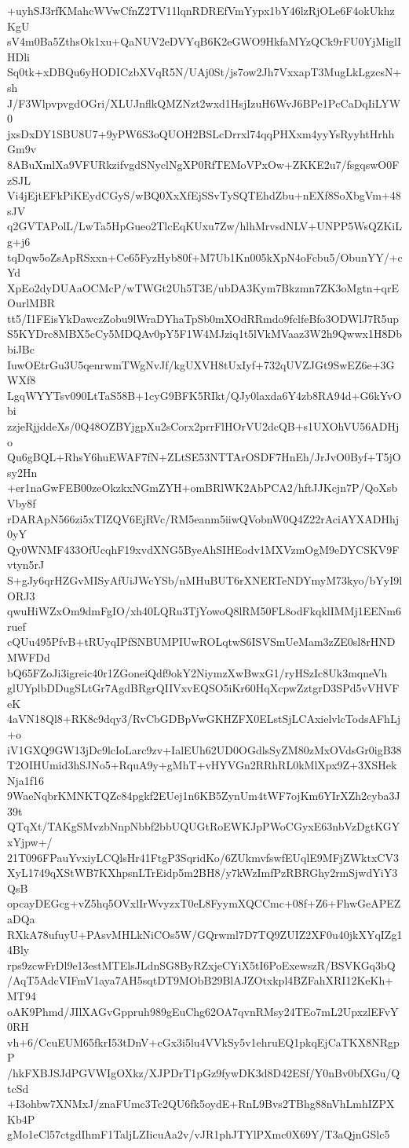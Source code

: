 +uyhSJ3rfKMahcWVwCfnZ2TV11lqnRDREfVmYypx1bY46lzRjOLe6F4okUkhzKgU
sV4m0Ba5ZthsOk1xu+QaNUV2eDVYqB6K2eGWO9HkfaMYzQCk9rFU0YjMiglIHDli
Sq0tk+xDBQu6yHODICzbXVqR5N/UAj0St/js7ow2Jh7VxxapT3MugLkLgzcsN+sh
J/F3WlpvpvgdOGri/XLUJnflkQMZNzt2wxd1HsjIzuH6WvJ6BPe1PcCaDqIiLYW0
jxsDxDY1SBU8U7+9yPW6S3oQUOH2BSLcDrrxl74qqPHXxm4yyYsRyyhtHrhhGm9v
8ABuXmlXa9VFURkzifvgdSNyclNgXP0RfTEMoVPxOw+ZKKE2u7/fsgqswO0FzSJL
Vi4jEjtEFkPiKEydCGyS/wBQ0XxXfEjSSvTySQTEhdZbu+nEXf8SoXbgVm+48sJV
q2GVTAPolL/LwTa5HpGueo2TlcEqKUxu7Zw/hlhMrvsdNLV+UNPP5WsQZKiLg+j6
tqDqw5oZsApRSxxn+Ce65FyzHyb80f+M7Ub1Kn005kXpN4oFcbu5/ObunYY/+cYd
XpEo2dyDUAaOCMcP/wTWGt2Uh5T3E/ubDA3Kym7Bkzmn7ZK3oMgtn+qrEOurlMBR
tt5/I1FEisYkDawczZobu9lWraDYhaTpSb0mXOdRRmdo9fclfeBfo3ODWlJ7R5up
S5KYDrc8MBX5cCy5MDQAv0pY5F1W4MJziq1t5lVkMVaaz3W2h9Qwwx1H8DbbiJBc
IuwOEtrGu3U5qenrwmTWgNvJf/kgUXVH8tUxIyf+732qUVZJGt9SwEZ6e+3GWXf8
LgqWYYTsv090LtTaS58B+1cyG9BFK5RIkt/QJy0laxda6Y4zb8RA94d+G6kYvObi
zzjeRjjddeXs/0Q48OZBYjgpXu2sCorx2prrFlHOrVU2dcQB+s1UXOhVU56ADHjo
Qu6gBQL+RhsY6huEWAF7fN+ZLtSE53NTTArOSDF7HnEh/JrJvO0Byf+T5jOsy2Hn
+er1naGwFEB00zeOkzkxNGmZYH+omBRlWK2AbPCA2/hftJJKcjn7P/QoXsbVby8f
rDARApN566zi5xTIZQV6EjRVc/RM5eanm5iiwQVobnW0Q4Z22rAciAYXADHhj0yY
Qy0WNMF433OfUcqhF19xvdXNG5ByeAhSIHEodv1MXVzmOgM9eDYCSKV9Fvtyn5rJ
S+gJy6qrHZGvMISyAfUiJWcYSb/nMHuBUT6rXNERTeNDYmyM73kyo/bYyI9lORJ3
qwuHiWZxOm9dmFgIO/xh40LQRu3TjYowoQ8lRM50FL8odFkqklIMMj1EENm6ruef
cQUu495PfvB+tRUyqIPfSNBUMPIUwROLqtwS6ISVSmUeMam3zZE0sl8rHNDMWFDd
bQ65FZoJi3igreic40r1ZGoneiQdf9okY2NiymzXwBwxG1/ryHSzIc8Uk3mqneVh
glUYplbDDugSLtGr7AgdBRgrQIIVxvEQSO5iKr60HqXcpwZztgrD3SPd5vVHVFeK
4aVN18Ql8+RK8c9dqy3/RvCbGDBpVwGKHZFX0ELstSjLCAxielvlcTodsAFhLj+o
iV1GXQ9GW13jDc9lcIoLarc9zv+IalEUh62UD0OGdlsSyZM80zMxOVdsGr0igB38
T2OIHUmid3hSJNo5+RquA9y+gMhT+vHYVGn2RRhRL0kMlXpx9Z+3XSHekNja1f16
9WaeNqbrKMNKTQZc84pgkf2EUej1n6KB5ZynUm4tWF7ojKm6YIrXZh2cyba3J39t
QTqXt/TAKgSMvzbNnpNbbf2bbUQUGtRoEWKJpPWoCGyxE63nbVzDgtKGYxYjpw+/
21T096FPauYvxiyLCQlsHr41FtgP3SqridKo/6ZUkmvfswfEUqlE9MFjZWktxCV3
XyL1749qXStWB7KXhpsnLTrEidp5m2BH8/y7kWzImfPzRBRGhy2rmSjwdYiY3QsB
opcayDEGcg+vZ5hq5OVxlIrWvyzxT0eL8FyymXQCCmc+08f+Z6+FhwGeAPEZaDQa
RXkA78ufuyU+PAsvMHLkNiCOs5W/GQrwml7D7TQ9ZUIZ2XF0u40jkXYqIZg14Bly
rps9zcwFrDl9e13estMTElsJLdnSG8ByRZxjeCYiX5tI6PoExewszR/BSVKGq3bQ
/AqT5AdcVIFmV1aya7AH5sqtDT9MObB29BlAJZOtxkpl4BZFahXRI12KeKh+MT94
oAK9Phmd/JIlXAGvGppruh989gEuChg62OA7qvnRMsy24TEo7mL2UpxzlEFvY0RH
vh+6/CcuEUM65fkrI53tDnV+cGx3i5lu4VVkSy5v1ehruEQ1pkqEjCaTKX8NRgpP
/hkFXBJSJdPGVWIgOXkz/XJPDrT1pGz9fywDK3d8D42ESf/Y0nBv0bfXGu/QtcSd
+I3ohbw7XNMxJ/znaFUmc3Tc2QU6fk5oydE+RnL9Bvs2TBhg88nVhLmhIZPXKb4P
gMo1eCl57ctgdIhmF1TaljLZIicuAa2v/vJR1phJTYlPXmc0X69Y/T3aQjnGSlc5
